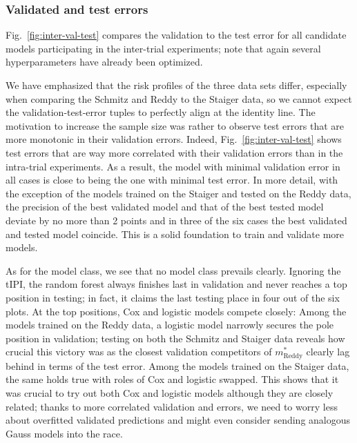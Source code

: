 \subsubsection{Validated and test errors}



Fig.\ \ref{fig:inter-val-test} compares the validation to the test error for all candidate models 
participating in the inter-trial experiments; note that again several hyperparameters have already 
been optimized. 

We have emphasized that the risk profiles of the three data sets differ, especially when comparing 
the Schmitz and Reddy to the Staiger data, so we cannot expect the validation-test-error tuples 
to perfectly align at the identity line. The motivation to increase the sample size was rather 
to observe test errors that are more monotonic in their validation errors. Indeed, Fig.\ 
\ref{fig:inter-val-test} shows test errors that are way more correlated with their validation errors 
than in the intra-trial experiments. As a result, the model with minimal validation error in all 
cases is close to being the one with minimal test error. In more detail, with the exception of 
the models trained on the Staiger and tested on the Reddy data, the precision of the best 
validated model and that of the best tested model deviate by no more than \num{2} points and in 
three of the six cases the best validated and tested model coincide. This is a solid foundation 
to train and validate more models.

As for the model class, we see that no model class prevails clearly. Ignoring the tIPI, the random 
forest always finishes last in validation and never reaches a top position in testing; in fact, 
it claims the last testing place in four out of the six plots. At the top positions, Cox and 
logistic models compete closely: Among the models trained on the Reddy data, a logistic model 
narrowly secures the pole position in validation; testing on both the Schmitz and Staiger 
data reveals how crucial this victory was as the closest validation competitors of 
$m^*_\text{Reddy}$ clearly lag behind in terms of the test error. Among the models trained on the 
Staiger data, the same holds true with roles of Cox and logistic swapped. This shows that it 
was crucial to try out both Cox and logistic models although they are closely related; thanks to 
more correlated validation and errors, we need to worry less about overfitted validated 
predictions and might even consider sending analogous Gauss models into the race.


